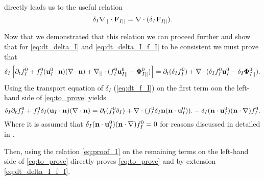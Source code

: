 directly leads us to the useful relation 
\begin{equation}
    \delta_I \mathbf{\nabla}_{||}\cdot \textbf{F}_{I||}
    = 
    \mathbf{\nabla}\cdot (\delta_I \textbf{F}_{I||}). 
    \label{eq:proof_1}
\end{equation}


Now that we demonstrated that this relation we can proceed further and show that for \ref{eq:dt_delta_I} and \ref{eq:dt_delta_I_f_I} to be consistent we must prove that 
\begin{equation}
    \delta_I
    \left[ \partial_t f_I^0 
    + f_I^0 (\textbf{u}_{I}^0\cdot \textbf{n})  (\mathbf{\nabla}\cdot \textbf{n})
    +\mathbf{\nabla}_{||}\cdot
    (f_I^0 \textbf{u}_{I||}^0
    - \mathbf{\Phi}_{I||}^0 )
    \right]
    =
    \partial_t (\delta_If_I^0) 
    +\mathbf{\nabla}\cdot
    (\delta_If_I^0 \textbf{u}_I^0
        - \delta_I\mathbf{\Phi}_{I||}^0 ).
    \label{eq:to_prove}
\end{equation}
Using the transport equation of $\delta_I$ (\ref{eq:dt_f_I}) on the first term oon the left-hand side of \ref{eq:to_prove} yields 
\begin{equation*}
    \delta_I \partial_t f_I^0 
    + f_I^0 \delta_I (\textbf{u}_I\cdot\textbf{n})(\mathbf{\nabla}\cdot \textbf{n})
    = 
     \partial_t (f_I^0 \delta_I)
    + \mathbf{\nabla}\cdot(f_I^0  \delta_I \textbf{n}(\textbf{n}\cdot\textbf{u}_I^0)). 
    - \delta_I (\textbf{n}\cdot\textbf{u}_I^0) (\textbf{n}\cdot \mathbf{\nabla})f_I^0. 
\end{equation*}
Where it is assumed that $\delta_I (\textbf{n}\cdot\textbf{u}_I^0)(\textbf{n}\cdot\mathbf{\nabla}) f_I^0 = 0$ for reasons discussed in detailed in \citet{orlando2023evolution,estrada1985distributional}. 


Then, using the relation \ref{eq:proof_1} on the remaining terms on the left-hand side of \ref{eq:to_prove} directly proves \ref{eq:to_prove} and by extension \ref{eq:dt_delta_I_f_I}. 



